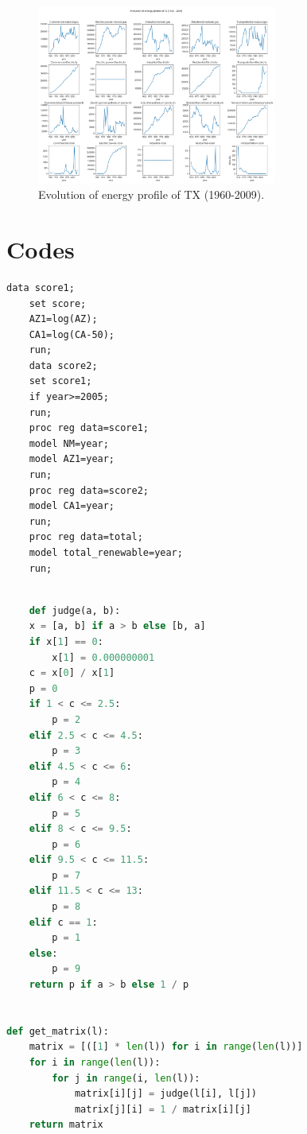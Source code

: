 \documentclass[a4paper,11pt]{article}
\begin{document}
\begin{appendices}
\begin{figure}[h]%
    \centering 
    \includegraphics[width=0.7\textwidth]{./Pic/part-2-TX.png}
    \caption{Evolution of energy profile of TX (1960-2009).}
    \label{fig:part-2-TX}  
\end{figure}
\section*{Codes}

\begin{lstlisting}[language=SAS, caption=regression.sas]
    data score1;
    set score;
    AZ1=log(AZ);
    CA1=log(CA-50);
    run;
    data score2;
    set score1;
    if year>=2005;
    run;
    proc reg data=score1;
    model NM=year;
    model AZ1=year;
    run;
    proc reg data=score2;
    model CA1=year;
    run;
    proc reg data=total;
    model total_renewable=year;
    run;
\end{lstlisting}

\begin{lstlisting}[language=Python, caption=score.py]

    def judge(a, b):
    x = [a, b] if a > b else [b, a]
    if x[1] == 0:
        x[1] = 0.000000001
    c = x[0] / x[1]
    p = 0
    if 1 < c <= 2.5:
        p = 2
    elif 2.5 < c <= 4.5:
        p = 3
    elif 4.5 < c <= 6:
        p = 4
    elif 6 < c <= 8:
        p = 5
    elif 8 < c <= 9.5:
        p = 6
    elif 9.5 < c <= 11.5:
        p = 7
    elif 11.5 < c <= 13:
        p = 8
    elif c == 1:
        p = 1
    else:
        p = 9
    return p if a > b else 1 / p


def get_matrix(l):
    matrix = [([1] * len(l)) for i in range(len(l))]
    for i in range(len(l)):
        for j in range(i, len(l)):
            matrix[i][j] = judge(l[i], l[j])
            matrix[j][i] = 1 / matrix[i][j]
    return matrix



\end{lstlisting}
\end{appendices}
\end{document}
